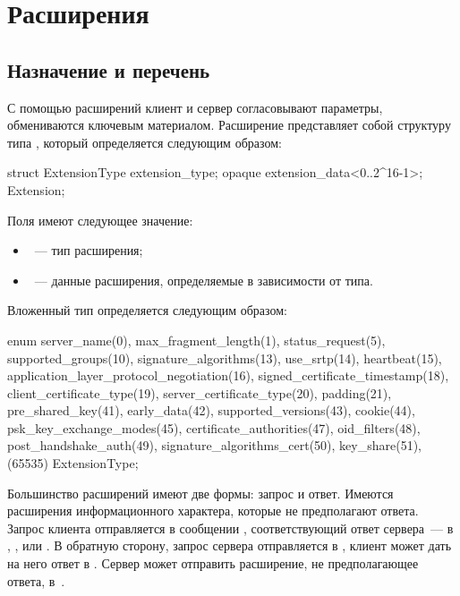 \section{Расширения}\label{HS.Ext} 

\subsection{Назначение и перечень}\label{HS.Ext.List}

С помощью расширений клиент и сервер согласовывают параметры, обмениваются 
ключевым материалом.
%
Расширение представляет собой структуру типа , который 
определяется следующим образом:
%
\begin{codeblock}
struct {
  ExtensionType extension_type;
  opaque extension_data<0..2^16-1>;
} Extension;
\end{codeblock}

Поля  имеют следующее значение:
\begin{itemize}
\item
{}~--- тип расширения;
\item
{}~--- данные расширения, определяемые в зависимости от типа.
\end{itemize}

Вложенный тип  определяется следующим образом:
\begin{codeblock}
enum {
  server_name(0),
  max_fragment_length(1),
  status_request(5),
  supported_groups(10),
  signature_algorithms(13),
  use_srtp(14),
  heartbeat(15),
  application_layer_protocol_negotiation(16),
  signed_certificate_timestamp(18),
  client_certificate_type(19),
  server_certificate_type(20),
  padding(21),
  pre_shared_key(41),
  early_data(42),
  supported_versions(43),
  cookie(44),
  psk_key_exchange_modes(45),
  certificate_authorities(47),
  oid_filters(48),
  post_handshake_auth(49),
  signature_algorithms_cert(50),
  key_share(51),
  (65535)
} ExtensionType;
\end{codeblock}

Большинство расширений имеют две формы: запрос и ответ.
%
Имеются расширения информационного характера, которые не предполагают ответа.
%
Запрос клиента отправляется в сообщении , 
соответствующий ответ сервера~--- в , 
,  или 
.
%
В обратную сторону, запрос сервера отправляется в 
, клиент может дать на него ответ в 
.
%
Сервер может отправить расширение, не предполагающее ответа, 
в~.

